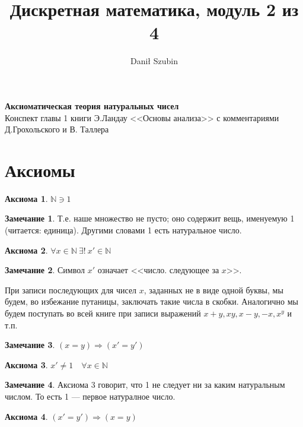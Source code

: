 \documentclass[12pt,oneside]{article}
\title{Дискретная математика, модуль 2 из 4}
\author{Danił Szubin}
\theoremstyle{definition}
\newtheorem{axiom}{Аксиома}
\newtheorem{remark}{Замечание}
\begin{document}
\maketitle
\tableofcontents
\newpage

\begin{center}
{\bf {\large Аксиоматическая теория натуральных чисел}}\\
Конспект главы 1 книги Э.Ландау <<Основы анализа>> с комментариями Д.Грохольского и В. Таллера
\end{center}

\section{Аксиомы}

\begin{axiom}
 $\mathbb{N}\ni 1$
\end{axiom}
\begin{remark}
Т.е. наше множество не пусто; оно содержит вещь, именуемую 1 (читается: единица). Другими словами 1 есть натуральное число.
\end{remark}

\begin{axiom}
$\forall x\in\mathbb{N} \  \exists ! \ x'\in\mathbb{N}$
\end{axiom}

\begin{remark}
Символ $x'$ означает <<число. следующее за $x$>>.

При записи последующих для чисел $x$, заданных не в виде одной буквы, мы будем, во избежание путаницы, заключать такие числа в скобки. Аналогично мы будем поступать во всей книге при записи выражений $x+y, xy, x-y,-x,x^y$  и т.п.
\end{remark}

\begin{remark}
$(x=y)\Longrightarrow (x'=y')$
\end{remark}

\begin{axiom}
$x'\neq 1\quad \forall x\in\mathbb{N}$
\end{axiom}

\begin{remark}
Аксиома 3 говорит, что 1 не следует ни за каким натуральным числом. То есть 1 --- первое натуралное число.
\end{remark} 

\begin{axiom}
$(x'=y')\Longrightarrow (x=y)$
\end{axiom} 
\end{document}
